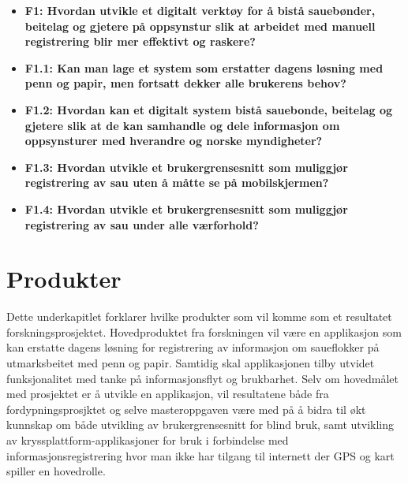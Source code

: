 \begin{itemize}
    \item \textbf{F1: Hvordan utvikle et digitalt verktøy for å bistå sauebønder, beitelag og gjetere på oppsynstur slik at arbeidet med manuell registrering blir mer effektivt og raskere?}
    \item \textbf{F1.1: Kan man lage et system som erstatter dagens løsning med penn og papir, men fortsatt dekker alle brukerens behov?}
    \item \textbf{F1.2: Hvordan kan et digitalt system bistå sauebonde, beitelag og gjetere slik at de kan samhandle og dele informasjon om oppsynsturer med hverandre og norske myndigheter?}
    \item \textbf{F1.3: Hvordan utvikle et brukergrensesnitt som muliggjør registrering av sau uten å måtte se på mobilskjermen?}
    \item \textbf{F1.4: Hvordan utvikle et brukergrensesnitt som muliggjør registrering av sau under alle værforhold?}
\end{itemize}

\section{Produkter}
Dette underkapitlet forklarer hvilke produkter som vil komme som et resultatet forskningsprosjektet.
\newline
\newline
\noindent
Hovedproduktet fra forskningen vil være en applikasjon som kan erstatte dagens løsning for registrering av informasjon om saueflokker på utmarksbeitet med penn og papir. Samtidig skal applikasjonen tilby utvidet funksjonalitet med tanke på informasjonsflyt og brukbarhet. Selv om hovedmålet med prosjektet er å utvikle en applikasjon, vil resultatene både fra fordypningsprosjktet og selve masteroppgaven være med på å bidra til økt kunnskap om både utvikling av brukergrensesnitt for blind bruk, samt utvikling av kryssplattform-applikasjoner for bruk i forbindelse med informasjonsregistrering hvor man ikke har tilgang til internett der GPS og kart spiller en hovedrolle.

